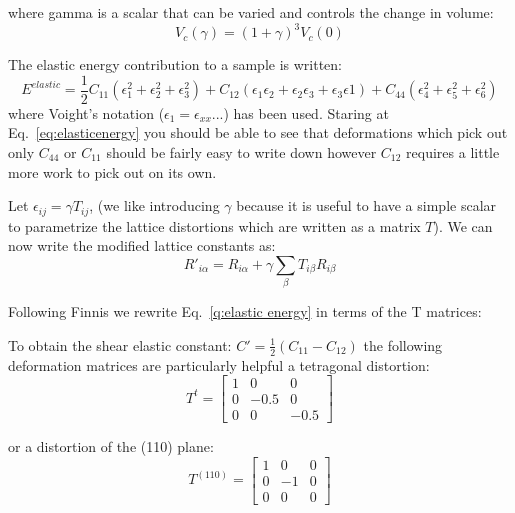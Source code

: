 where gamma is a scalar that can be varied and controls the change in volume:
%
\begin{equation}
V_{c}(\gamma) = (1+\gamma)^{3}V_{c}(0)
\end{equation}
%

The elastic energy contribution to a sample is written:
%
\begin{equation}
\label{eq:eq:elasticenergy}
E^{elastic} = \frac{1}{2}C_{11}(\epsilon^{2}_{1} + \epsilon^{2}_{2} + \epsilon^{2}_{3}) + C_{12}(\epsilon_{1}\epsilon_{2}
+\epsilon_{2}\epsilon_{3} + \epsilon_{3}\epsilon{1}) + C_{44}(\epsilon^{2}_{4} + \epsilon^{2}_{5} + \epsilon^{2}_{6})
\end{equation}
%
where Voight's notation ($\epsilon_{1}=\epsilon_{xx}$...) has been used. Staring at Eq.~\ref{eq:elasticenergy} you
should be able to see that deformations which pick out only $C_{44}$ or $C_{11}$ should be fairly easy to write down
however $C_{12}$ requires a little more work to pick out on its own.

Let $\epsilon_{ij} = \gamma T_{ij}$, (we like introducing $\gamma$ because it is useful to have a simple scalar
to parametrize the lattice distortions which are written as a matrix $T$).
We can now write the modified lattice constants as:
%
\begin{equation}
R'_{i\alpha} =  R_{i\alpha} + \gamma \sum_{\beta} T_{i\beta}R_{i\beta}
\end{equation}
%

Following Finnis we rewrite Eq.~\ref{q:elastic energy} in terms of the T matrices:

To obtain the shear elastic constant: $C' = \frac{1}{2}(C_{11}-C_{12})$ the following deformation
matrices are particularly helpful a tetragonal distortion:
%
\begin{equation}
T^{t} =  
    \begin{bmatrix}
         1 &   0   & 0  \\
         0 &  -0.5 & 0  \\    
         0 &   0   &-0.5 
    \end{bmatrix}
\end{equation}

or a distortion of the (110) plane:
%
\begin{equation}
T^{(110)} = 
    \begin{bmatrix}
            1 &  0 & 0  \\
            0 & -1 & 0  \\    
            0 &  0 & 0 
    \end{bmatrix}
\end{equation}

